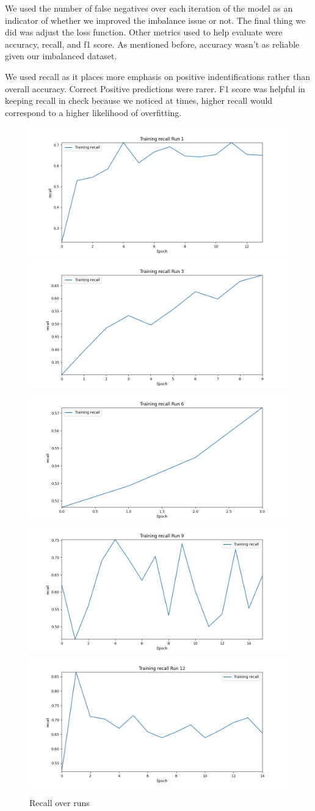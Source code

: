 We used the number of false negatives over each iteration of the model as an indicator of whether we improved the imbalance issue or not. 
The final thing we did was adjust the loss function. Other metrics used to help evaluate were accuracy, recall, and f1 score. As mentioned before, accuracy wasn't as reliable 
given our imbalanced dataset. 



We used recall as it places more emphasis on positive indentifications rather than overall accuracy. 
Correct Positive predictions were rarer. F1 score was helpful in keeping recall in check because we noticed at times, 
higher recall would correspond to a higher likelihood of overfitting. 

\begin{figure}[h]
    \centering
    \includegraphics[width=0.30\linewidth]{img/training_recall_run_1.png}
    \includegraphics[width=0.30\linewidth]{img/training_recall_run_3.png}
    \includegraphics[width=0.30\linewidth]{img/training_recall_run_6.png}
    \includegraphics[width=0.30\linewidth]{img/training_recall_run_9.png}
    \includegraphics[width=0.30\linewidth]{img/training_recall_run_12.png}
    \caption{Recall over runs}
    \label{fig:result2}
\end{figure}

